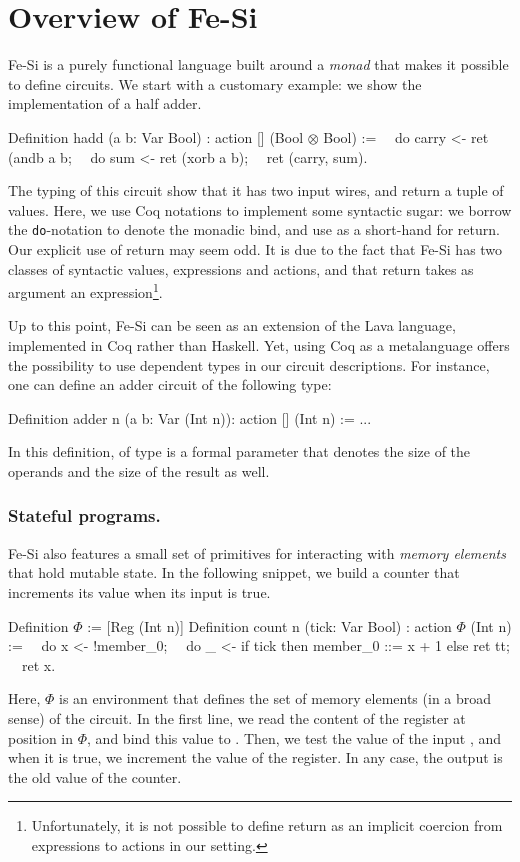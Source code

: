 \documentclass{llncs}
\begin{document}
\section{Overview of Fe-Si}
Fe-Si is a purely functional language built around a \emph{monad} that
makes it possible to define circuits. We start with a customary
example: we show the implementation of a half adder.
\begin{coq}
Definition hadd (a b: Var Bool) : action [] (Bool $\otimes$ Bool) :=
$\quad$do carry <- ret (andb a b; 
$\quad$do sum    <- ret (xorb a b);
$\quad$ret (carry, sum).  
\end{coq}
The typing of this circuit show that it has two input wires, and
return a tuple of values. 
%
Here, we use Coq notations to implement some syntactic sugar: we
borrow the \texttt{do}-notation to denote the monadic bind, and use
 as a short-hand for return. 
% 
Our explicit use of return may seem odd. It is due to the fact that
Fe-Si has two classes of syntactic values, expressions and actions,
and that return takes as argument an
expression\footnote{Unfortunately, it is not possible to define return
  as an implicit coercion from expressions to actions in our setting.}. 

Up to this point, Fe-Si can be seen as an extension of the Lava
language, implemented in Coq rather than Haskell. Yet, using Coq as a
metalanguage offers the possibility to use dependent types in our
circuit descriptions. For instance, one can define an adder circuit of
the following type:
\begin{coq}
Definition adder n (a b: Var (Int n)): action [] (Int n) := ...
\end{coq}
In this definition,  of type  is a formal parameter
that denotes the size of the operands and the size of the result as
well. 

\subsubsection{Stateful programs.}
Fe-Si also features a small set of primitives for interacting with
\emph{memory elements} that hold mutable state. In the following
snippet, we build a counter that increments its value when its input
is true.
\begin{coq}
Definition $\Phi$ := [Reg (Int n)]
Definition count n (tick: Var Bool) : action $\Phi$ (Int n) :=
$\quad$do x <- !member_0;
$\quad$do _ <- if tick then {member_0 ::= x + 1} else {ret tt}; 
$\quad$ret x. 
\end{coq}
Here, $\Phi$ is an environment that defines the set of memory elements
(in a broad sense) of the circuit. In the first line, we read the
content of the register at position  in $\Phi$, and
bind this value to . Then, we test the value of the input
, and when it is true, we increment the value of the
register. In any case, the output is the old value of the counter.
\end{document}
